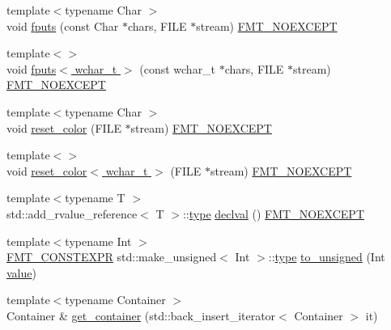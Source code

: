 \begin{DoxyCompactItemize}
\item 
{\footnotesize template$<$typename Char $>$ }\\void \hyperlink{namespaceinternal_a5fd63d7d21f506c8c738e5dcecccd35f}{fputs} (const Char $\ast$chars, F\+I\+LE $\ast$stream) \hyperlink{core_8h_aef128913e8400683b1cbd1a3a2e11df3}{F\+M\+T\+\_\+\+N\+O\+E\+X\+C\+E\+PT}
\item 
{\footnotesize template$<$$>$ }\\void \hyperlink{namespaceinternal_aa9495944933a6b99e0c7920dde6aecb0}{fputs$<$ wchar\+\_\+t $>$} (const wchar\+\_\+t $\ast$chars, F\+I\+LE $\ast$stream) \hyperlink{core_8h_aef128913e8400683b1cbd1a3a2e11df3}{F\+M\+T\+\_\+\+N\+O\+E\+X\+C\+E\+PT}
\item 
{\footnotesize template$<$typename Char $>$ }\\void \hyperlink{namespaceinternal_aef3df5de8950cb056b5f412ba9e8033f}{reset\+\_\+color} (F\+I\+LE $\ast$stream) \hyperlink{core_8h_aef128913e8400683b1cbd1a3a2e11df3}{F\+M\+T\+\_\+\+N\+O\+E\+X\+C\+E\+PT}
\item 
{\footnotesize template$<$$>$ }\\void \hyperlink{namespaceinternal_a90b9a62d1536ba128a175690641f32d4}{reset\+\_\+color$<$ wchar\+\_\+t $>$} (F\+I\+LE $\ast$stream) \hyperlink{core_8h_aef128913e8400683b1cbd1a3a2e11df3}{F\+M\+T\+\_\+\+N\+O\+E\+X\+C\+E\+PT}
\item 
{\footnotesize template$<$typename T $>$ }\\std\+::add\+\_\+rvalue\+\_\+reference$<$ T $>$\+::\hyperlink{namespaceinternal_a8661864098ac0acff9a6dd7e66f59038}{type} \hyperlink{namespaceinternal_a5f61aadb1d6afc8b79ef7ea57c39eafc}{declval} () \hyperlink{core_8h_aef128913e8400683b1cbd1a3a2e11df3}{F\+M\+T\+\_\+\+N\+O\+E\+X\+C\+E\+PT}
\item 
{\footnotesize template$<$typename Int $>$ }\\\hyperlink{core_8h_a69201cb276383873487bf68b4ef8b4cd}{F\+M\+T\+\_\+\+C\+O\+N\+S\+T\+E\+X\+PR} std\+::make\+\_\+unsigned$<$ Int $>$\+::\hyperlink{namespaceinternal_a8661864098ac0acff9a6dd7e66f59038}{type} \hyperlink{namespaceinternal_acc608c40c33952a5382db8aaaddfc854}{to\+\_\+unsigned} (Int \hyperlink{classinternal_1_1value}{value})
\item 
{\footnotesize template$<$typename Container $>$ }\\Container \& \hyperlink{namespaceinternal_a8cf1f0f18fd01743349131744dc7c1c3}{get\+\_\+container} (std\+::back\+\_\+insert\+\_\+iterator$<$ Container $>$ it)
\item 

\end{DoxyCompactItemize}
